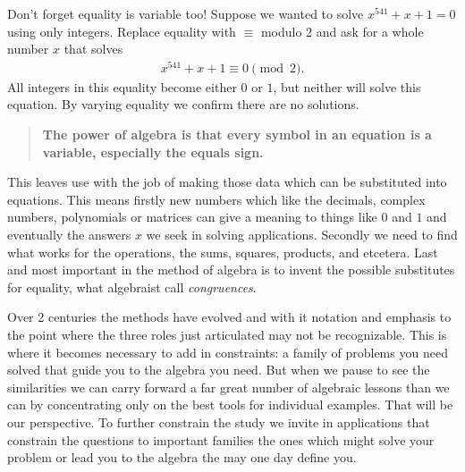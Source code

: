 Don't forget equality is variable too!  Suppose we wanted to solve $x^{541}+x+1=0$
using only integers.  Replace equality 
with $\equiv$ modulo 2 and ask for a whole number $x$ that solves
\begin{align*}
    x^{541}+x+1\equiv 0\pmod{2}.
\end{align*}
All integers in this equality become either $0$ or $1$, but neither will solve 
this equation.  By varying equality we confirm there are no solutions.


\begin{quote}
    \textbf{The power of algebra is that every symbol 
    in an equation is a variable, especially the equals sign.}
\end{quote}

This leaves use with the job of making those data which can be substituted 
into equations.  This means firstly new numbers which like the decimals, complex 
numbers, polynomials or matrices can give a meaning to things like $0$ and $1$
and eventually the answers $x$ we seek in solving applications.  Secondly 
we need to find what works for the operations, the sums, squares, products, and 
etcetera.  Last and most important in the method of algebra is to invent the possible 
substitutes for equality, what algebraist call \emph{congruences}.  

Over 2 centuries the methods have evolved and with it notation and emphasis to
the point where the three roles just articulated may not be recognizable.  
This is where it becomes necessary to add in constraints: a family of problems 
you need solved that guide you to the algebra you need.  But when we pause to see 
the similarities we can carry forward a far great number of algebraic lessons 
than we can by concentrating only on the best tools for individual examples.
That will be our perspective.  To further constrain the study we invite in 
applications that constrain the questions to important families the ones
which might solve your problem or lead you to the algebra the may one day define you.

